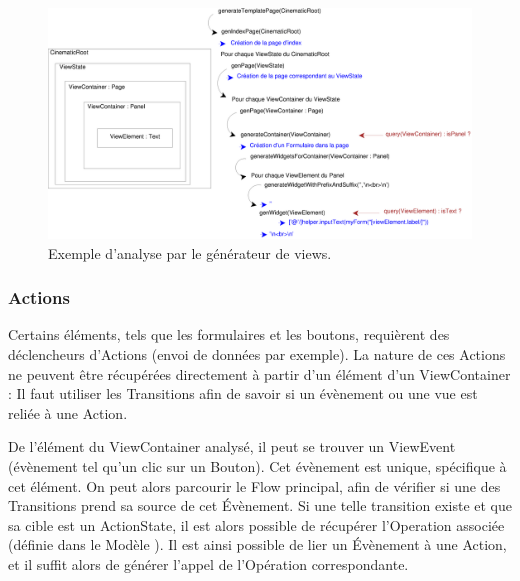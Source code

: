 
\begin{figure}[H]
  \centering
  \includegraphics[scale=.35]{img/viewexample.eps}
  \caption{Exemple d'analyse par le générateur de views.}
  \label{fig:ex_view}
\end{figure}

\subsubsection{Actions}
Certains éléments, tels que les formulaires et les boutons, requièrent des déclencheurs d'Actions (envoi de données par exemple). La nature de ces Actions ne peuvent être récupérées directement à partir d'un élément d'un ViewContainer : Il faut utiliser les Transitions afin de savoir si un évènement ou une vue est reliée à une Action.

De l'élément du ViewContainer analysé, il peut se trouver un ViewEvent (évènement tel qu'un clic sur un Bouton). Cet évènement est unique, spécifique à cet élément. On peut alors parcourir le Flow principal, afin de vérifier si une des Transitions prend sa source de cet Évènement. Si une telle transition existe et que sa cible est un ActionState, il est alors possible de récupérer l'Operation associée (définie dans le Modèle \kwsoa). Il est ainsi possible de lier un Évènement à une Action, et il suffit alors de générer l'appel de l'Opération correspondante.

